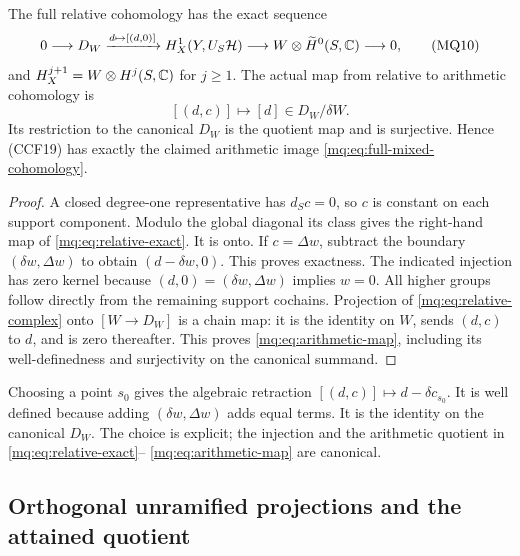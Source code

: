\begin{proposition}
\label{mq:prop:arithmetic-image}
The full relative cohomology has the exact sequence
\[
 0\longrightarrow D_W\xrightarrow{d\mapsto[(d,0)]}
 H_X^1(Y,U_S\mathcal H)
 \longrightarrow W\otimes\widetilde H^0(S,\mathbb C)
 \longrightarrow0,
 \tag{MQ10}\label{mq:eq:relative-exact}
\]
and $H_X^{j+1}=W\otimes H^j(S,\mathbb C)$ for $j\ge1$.
The actual map from relative to arithmetic cohomology is
\[
 [(d,c)]\longmapsto[d]\in D_W/\delta W.
 \tag{MQ11}\label{mq:eq:arithmetic-map}
\]
Its restriction to the canonical $D_W$ is the quotient map and
is surjective. Hence (CCF19) has exactly the claimed arithmetic
image \eqref{mq:eq:full-mixed-cohomology}.
\end{proposition}
\begin{proof}
A closed degree-one representative has $d_Sc=0$, so $c$ is
constant on each support component. Modulo the global diagonal
its class gives the right-hand map of \eqref{mq:eq:relative-exact}.
It is onto. If $c=\Delta w$, subtract the boundary
$(\delta w,\Delta w)$ to obtain $(d-\delta w,0)$. This proves
exactness. The indicated injection has zero kernel because
$(d,0)=(\delta w,\Delta w)$ implies $w=0$. All higher groups
follow directly from the remaining support cochains. Projection
of \eqref{mq:eq:relative-complex} onto $[W\to D_W]$ is a chain map:
it is the identity on $W$, sends $(d,c)$ to $d$, and is zero
thereafter. This proves \eqref{mq:eq:arithmetic-map}, including its
well-definedness and surjectivity on the canonical summand.
\end{proof}

Choosing a point $s_0$ gives the algebraic retraction
$[(d,c)]\mapsto d-\delta c_{s_0}$. It is well defined because
adding $(\delta w,\Delta w)$ adds equal terms. It is the identity
on the canonical $D_W$. The choice is explicit; the injection
and the arithmetic quotient in \eqref{mq:eq:relative-exact}--
\eqref{mq:eq:arithmetic-map} are canonical.

\subsection{Orthogonal unramified projections and the attained quotient}

